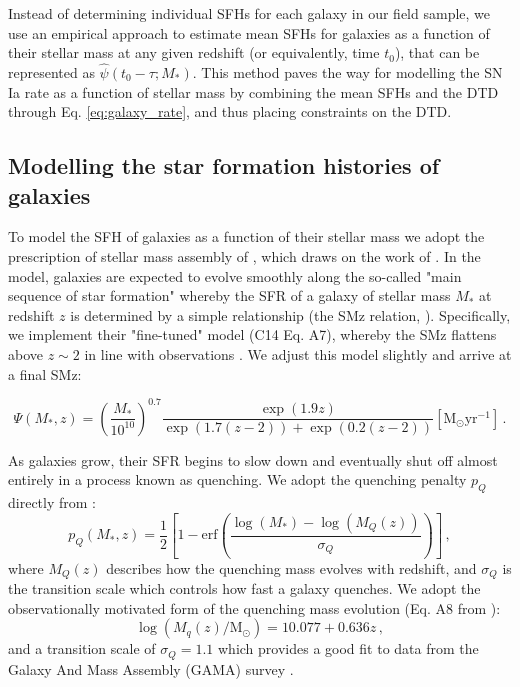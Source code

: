 \documentclass[fleqn,usenatbib]{mnras}
\begin{document}
Instead of determining individual SFHs for each galaxy in our field sample, we use an empirical approach to estimate mean SFHs for galaxies as a function of their stellar mass at any given redshift (or equivalently, time $t_0$), that can be represented as $\hat \psi \left(t_0 -\tau; M_* \right)$. This method paves the way for modelling the SN Ia rate as a function of stellar mass by combining the mean SFHs and the DTD through Eq. \ref{eq:galaxy_rate}, and thus placing constraints on the DTD.

\subsection{Modelling the star formation histories of galaxies \label{subsec:method_sfh}}

To model the SFH of galaxies as a function of their stellar mass we adopt the prescription of stellar mass assembly of \citet{Childress2014}, which draws on the work of \citet{Zahid2012}. In the model, galaxies are expected to evolve smoothly along the so-called "main sequence of star formation" whereby the SFR of a galaxy of stellar mass $M_*$ at redshift $z$ is determined by a simple relationship (the SMz relation, \citealt{Zahid2012}). Specifically, we implement their "fine-tuned" model (C14 Eq. A7), whereby the SMz flattens above $z\sim2$ in line with observations \citep{Stark2013}. We adjust this model slightly and arrive at a final SMz:

\begin{equation}
    \Psi(M_*,z) = \left(\frac{M_*}{10^{10}}\right)^{0.7}\frac{\exp{\left(1.9z\right)}}{\exp{\left(1.7\left(z-2\right)\right)} + \exp{\left(0.2\left(z-2\right)\right)} } [\mathrm{M}_{\odot} \mathrm{yr}^{-1}]\,.
\end{equation}

As galaxies grow, their SFR begins to slow down and eventually shut off almost entirely in a process known as quenching. We adopt the quenching penalty $p_Q$ directly from \citet{Childress2014}:
\begin{equation}
    p_Q(M_*,z) = \frac{1}{2}\left[1 - \mathrm{erf}\left(\frac{\log(M_*) - \log(M_Q(z))}{\sigma_Q}\right)\right]\,,
    \label{eq:pq}
\end{equation}
where $M_Q(z)$ describes how the quenching mass evolves with redshift, and $\sigma_Q$ is the transition scale which controls how fast a galaxy quenches. We adopt the observationally motivated form of the quenching mass evolution (Eq. A8 from \citealt{Childress2014}):
\begin{equation}
    \log(M_q(z)/\mathrm{M}_{\odot}) = 10.077 + 0.636z \,, 
    \label{eq:mq}
\end{equation}
and a transition scale of $\sigma_Q = 1.1$ which provides a good fit to data from the Galaxy And Mass Assembly (GAMA) survey \citep{Baldry2012}.
\end{document}
